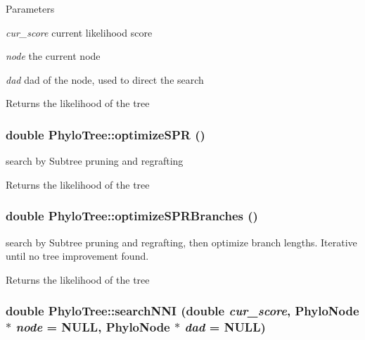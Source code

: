 \begin{DoxyParams}{Parameters}
\item[{\em cur\_\-score}]current likelihood score \item[{\em node}]the current node \item[{\em dad}]dad of the node, used to direct the search \end{DoxyParams}
\begin{DoxyReturn}{Returns}
the likelihood of the tree 
\end{DoxyReturn}
\hypertarget{classPhyloTree_ae2a229415387b5eb9f36c3bb078b6d80}{
\subsubsection[{optimizeSPR}]{\setlength{\rightskip}{0pt plus 5cm}double PhyloTree::optimizeSPR ()}}
\label{classPhyloTree_ae2a229415387b5eb9f36c3bb078b6d80}
search by Subtree pruning and regrafting \begin{DoxyReturn}{Returns}
the likelihood of the tree 
\end{DoxyReturn}
\hypertarget{classPhyloTree_a071475b37be90fb615e26b38d72a574f}{
\subsubsection[{optimizeSPRBranches}]{\setlength{\rightskip}{0pt plus 5cm}double PhyloTree::optimizeSPRBranches ()}}
\label{classPhyloTree_a071475b37be90fb615e26b38d72a574f}
search by Subtree pruning and regrafting, then optimize branch lengths. Iterative until no tree improvement found. \begin{DoxyReturn}{Returns}
the likelihood of the tree 
\end{DoxyReturn}
\hypertarget{classPhyloTree_a87ed271cb0d09ad3069a20d996c343f9}{
\subsubsection[{searchNNI}]{\setlength{\rightskip}{0pt plus 5cm}double PhyloTree::searchNNI (double {\em cur\_\-score}, \/  {\bf PhyloNode} $\ast$ {\em node} = {\ttfamily NULL}, \/  {\bf PhyloNode} $\ast$ {\em dad} = {\ttfamily NULL})}}
